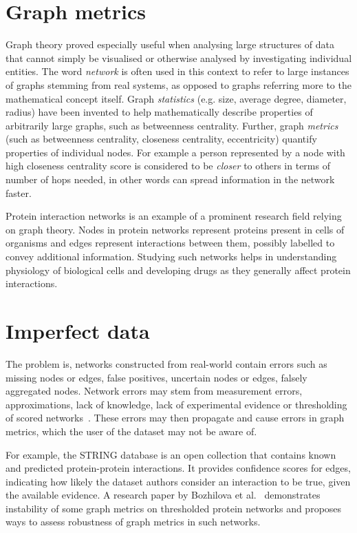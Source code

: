 \section{Graph metrics}

Graph theory proved especially useful when analysing large structures of data that cannot simply be visualised or otherwise analysed by investigating individual entities.
The word \textsl{network} is often used in this context to refer to large instances of graphs stemming from real systems, as opposed to graphs referring more to the mathematical concept itself.
Graph \textsl{statistics} (e.g. size, average degree, diameter, radius) have been invented to help mathematically describe properties of arbitrarily large graphs, such as betweenness centrality.
Further, graph \textsl{metrics} (such as betweenness centrality, closeness centrality, eccentricity) quantify properties of individual nodes.
For example a person represented by a node with high closeness centrality score is considered to be \textsl{closer} to others in terms of number of hops needed, in other words can spread information in the network faster.

Protein interaction networks is an example of a prominent research field relying on graph theory.
Nodes in protein networks represent proteins present in cells of organisms and edges represent interactions between them, possibly labelled to convey additional information.
Studying such networks helps in understanding physiology of biological cells and developing drugs as they generally affect protein interactions.


\section{Imperfect data}

The problem is, networks constructed from real-world contain errors such as missing nodes or edges, false positives, uncertain nodes or edges, falsely aggregated nodes.
Network errors may stem from measurement errors, approximations, lack of knowledge, lack of experimental evidence or thresholding of scored networks~\cite{Wang2012,MarsdenNetworkDataMeasurement1990,JonesChallengesLimitationsQuantifying2010}.
These errors may then propagate and cause errors in graph metrics, which the user of the dataset may not be aware of. 

For example, the STRING database\cite{Szklarczyk2019} is an open collection that contains known and predicted protein-protein interactions.
It provides confidence scores for edges, indicating how likely the dataset authors consider an interaction to be true, given the available evidence.
A research paper by Bozhilova et al.~\cite{Bozhilova2019} demonstrates instability of some graph metrics on thresholded protein networks and proposes ways to assess robustness of graph metrics in such networks.


